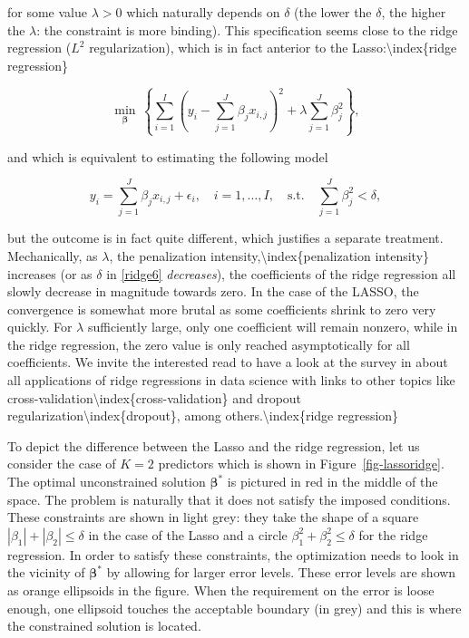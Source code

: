 for some value $\lambda>0$ which naturally depends on $\delta$ (the lower the $\delta$, the higher the $\lambda$: the constraint is more binding). This specification seems close to the ridge regression ($L^2$ regularization), which is in fact anterior to the Lasso:{\textbackslash}index\{ridge regression\}

\begin{equation}
\label{ridge}
\underset{\mathbf{\beta}}{\min} \, \left\{ \sum_{i=1}^I\left(y_i - \sum_{j=1}^J\beta_jx_{i,j} \right)^2+\lambda \sum_{j=1}^J \beta_j^2 \right\},
\end{equation}

and which is equivalent to estimating the following model

\begin{equation}
\label{ridge6}
y_i = \sum_{j=1}^J \beta_jx_{i,j} + \epsilon_i, \quad i =1,\dots,I, \quad \text{s.t.} \quad \sum_{j=1}^J \beta_j^2 < \delta,
\end{equation}

but the outcome is in fact quite different, which justifies a separate treatment. Mechanically, as $\lambda$, the penalization intensity,{\textbackslash}index\{penalization intensity\} increases (or as $\delta$ in \ref{ridge6} \textit{decreases}), the coefficients of the ridge regression all slowly decrease in magnitude towards zero. In the case of the LASSO, the convergence is somewhat more brutal as some coefficients shrink to zero very quickly. For $\lambda$ sufficiently large, only one coefficient will remain nonzero, while in the ridge regression, the zero value is only reached asymptotically for all coefficients. We invite the interested read to have a look at the survey in \cite{hastie2020ridge} about all applications of ridge regressions in data science with links to other topics like cross-validation{\textbackslash}index\{cross-validation\} and dropout regularization{\textbackslash}index\{dropout\}, among others.{\textbackslash}index\{ridge regression\}

To depict the difference between the Lasso and the ridge regression, let us consider the case of $K=2$ predictors which is shown in Figure~\ref{fig-lassoridge}. The optimal unconstrained solution $\boldsymbol{\beta}^*$ is pictured in red in the middle of the space. The problem is naturally that it does not satisfy the imposed conditions. These constraints are shown in light grey: they take the shape of a square $|\beta_1|+|\beta_2| \le \delta$ in the case of the Lasso and a circle $\beta_1^2+\beta_2^2 \le \delta$ for the ridge regression. In order to satisfy these constraints, the optimization needs to look in the vicinity of $\boldsymbol{\beta}^*$ by allowing for larger error levels. These error levels are shown as orange ellipsoids in the figure. When the requirement on the error is loose enough, one ellipsoid touches the acceptable boundary (in grey) and this is where the constrained solution is located.


